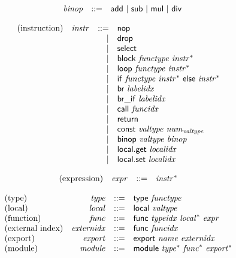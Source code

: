 \documentclass{article}
\begin{document}
$$
\begin{array}{@{}lrrl@{}l@{}}
	& {\mathit{binop}} &::=& \mathsf{add} ~|~ \mathsf{sub} ~|~ \mathsf{mul} ~|~ \mathsf{div} \\
\end{array}
$$

\vspace{1ex}

$$
\begin{array}{@{}lrrl@{}l@{}}
	\mbox{(instruction)} & {\mathit{instr}} &::=& \mathsf{nop} \\ &&|&
	\mathsf{drop} \\ &&|&
	\mathsf{select} \\ &&|&
	\mathsf{block}~{\mathit{functype}}~{{\mathit{instr}}^\ast} \\ &&|&
	\mathsf{loop}~{\mathit{functype}}~{{\mathit{instr}}^\ast} \\ &&|&
	\mathsf{if}~{\mathit{functype}}~{{\mathit{instr}}^\ast}~\mathsf{else}~{{\mathit{instr}}^\ast} \\ &&|&
	\mathsf{br}~{\mathit{labelidx}} \\ &&|&
	\mathsf{br\_if}~{\mathit{labelidx}} \\ &&|&
	\mathsf{call}~{\mathit{funcidx}} \\ &&|&
	\mathsf{return} \\ &&|&
	\mathsf{const}~{\mathit{valtype}}~{{\mathit{num}}}_{{\mathit{valtype}}} \\ &&|&
	\mathsf{binop}~{\mathit{valtype}}~{\mathit{binop}} \\ &&|&
	\mathsf{local.get}~{\mathit{localidx}} \\ &&|&
	\mathsf{local.set}~{\mathit{localidx}} \\
\end{array}
$$

\vspace{1ex}

$$
\begin{array}{@{}lrrl@{}l@{}}
	\mbox{(expression)} & {\mathit{expr}} &::=& {{\mathit{instr}}^\ast} \\
\end{array}
$$

\vspace{1ex}

$$
\begin{array}{@{}lrrl@{}l@{}}
	\mbox{(type)} & {\mathit{type}} &::=& \mathsf{type}~{\mathit{functype}} \\
	\mbox{(local)} & {\mathit{local}} &::=& \mathsf{local}~{\mathit{valtype}} \\
	\mbox{(function)} & {\mathit{func}} &::=& \mathsf{func}~{\mathit{typeidx}}~{{\mathit{local}}^\ast}~{\mathit{expr}} \\
	\mbox{(external index)} & {\mathit{externidx}} &::=& \mathsf{func}~{\mathit{funcidx}} \\
	\mbox{(export)} & {\mathit{export}} &::=& \mathsf{export}~{\mathit{name}}~{\mathit{externidx}} \\
	\mbox{(module)} & {\mathit{module}} &::=& \mathsf{module}~{{\mathit{type}}^\ast}~{{\mathit{func}}^\ast}~{{\mathit{export}}^\ast} \\
\end{array}
$$
\end{document}
